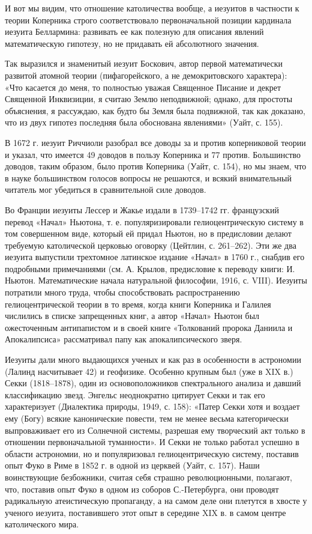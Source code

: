 И  вот мы  видим,  что  отношение католичества  вообще,  а иезуитов  в
частности  к теории  Коперника  строго соответствовало  первоначальной
позиции  кардинала  иезуита  Беллармина:  развивать  ее  как  полезную
для  описания  явлений математическую  гипотезу,  но  не придавать  ей
абсолютного значения.

Так выразился и знаменитый иезуит Боскович, автор первой математически
развитой   атомной  теории   (пифагорейского,  а   не  демокритовского
характера):  «Что  касается до  меня,  то  полностью уважая  Священное
Писание  и декрет  Священной Инквизиции,  я считаю  Землю неподвижной;
однако, для простоты объяснения, я  рассуждаю, как будто бы Земля была
подвижной,  так  как доказано,  что  из  двух гипотез  последняя  была
обоснована явлениями» (Уайт, с. 155).

В 1672 г. иезуит Риччиоли разобрал все доводы за и против коперниковой
теории  и указал,  что  имеется 49  доводов в  пользу  Коперника и  77
против.  Большинство доводов,  таким  образом,  было против  Коперника
(Уайт,  с.  154),  но  мы  знаем, что  в  науке  большинством  голосов
вопросы не  решаются, и всякий  внимательный читатель мог  убедиться в
сравнительной силе доводов.

Во Франции иезуиты Лессер и  Жакье издали в 1739--1742 гг. французский
перевод  «Начал»  Ньютона,  т. е.  популяризировали  гелиоцентрическую
систему  в  том совершенном  виде,  который  ей  придал Ньютон,  но  в
предисловии делают требуемую  католической церковью оговорку (Цейтлин,
с.  261--262).  Эти  же  два иезуита  выпустили  трехтомное  латинское
издание «Начал» в 1760 г., снабдив его подробными примечаниями (см. А.
Крылов, предисловие к переводу книги: И. Ньютон. Математические начала
натуральной философии, 1916, с.  VIII). Иезуиты потратили много труда,
чтобы  способствовать распространению  гелиоцентрической  теории в  то
время, когда книги Коперника и  Галилея числились в списке запрещенных
книг, а автор  «Начал» Ньютон был ожесточенным антипапистом  и в своей
книге «Толкований  пророка Даниила  и Апокалипсиса»  рассматривал папу
как апокалипсического зверя.

Иезуиты  дали  много выдающихся  ученых  и  как  раз в  особенности  в
астрономии  (Лалинд  насчитывает  42) и  геофизике.  Особенно  крупным
был  (уже  в XIX  в.)  Секки  (1818--1878), один  из  основоположников
спектрального   анализа   и   давший  классификацию   звезд.   Энгельс
неоднократно  цитирует  Секки  и  так  его  характеризует  (Диалектика
природы, 1949, с. 158): «Патер Секки  хотя и воздает ему (Богу) всякие
канонические повести, тем не  менее весьма категорически выпроваживает
его  из  Солнечной  системы,  разрешая ему  творческий  акт  только  в
отношении  первоначальной  туманности».  И  Секки  не  только  работал
успешно  в области  астрономии, но  и популяризовал  гелиоцентрическую
систему,  поставив опыт  Фуко в  Риме  в 1852  г. в  одной из  церквей
(Уайт,  с. 157).  Наши  воинствующие безбожники,  считая себя  страшно
революционными, полагают, что,  поставив опыт Фуко в  одном из соборов
С.-Петербурга, они проводят радикальную атеистическую пропаганду, а на
самом деле они плетутся в  хвосте у ученого иезуита, поставившего этот
опыт в середине XIX в. в самом центре католического мира.

